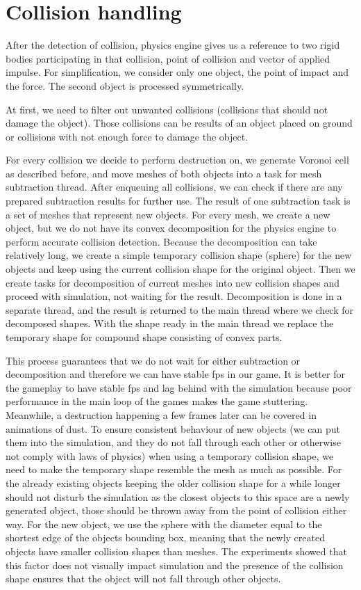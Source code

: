 \section{Collision handling}
\label{sec:collisions}
After the detection of collision, physics engine gives us a reference to two rigid bodies participating in that collision, point of collision and vector of applied impulse. For simplification, we consider only one object, the point of impact and the force. The second object is processed symmetrically.

At first, we need to filter out unwanted collisions (collisions that should not damage the object). Those collisions can be results of an object placed on ground or collisions with not enough force to damage the object. 

For every collision we decide to perform destruction on, we generate Voronoi cell as described before, and move meshes of both objects into a task for mesh subtraction thread. After enqueuing all collisions, we can check if there are any prepared subtraction results for further use. The result of one subtraction task is a set of meshes that represent new objects. For every mesh, we create a new object, but we do not have its convex decomposition for the physics engine to perform accurate collision detection. Because the decomposition can take relatively long, we create a simple temporary collision shape (\eg sphere) for the new objects and keep using the current collision shape for the original object. Then we create tasks for decomposition of current meshes into new collision shapes and proceed with simulation, not waiting for the result. Decomposition is done in a separate thread, and the result is returned to the main thread where we check for decomposed shapes. With the shape ready in the main thread we replace the temporary shape for compound shape consisting of convex parts.

This process guarantees that we do not wait for either subtraction or decomposition and therefore we can have stable fps in our game.  It is better for the gameplay to have stable fps and lag behind with the simulation because poor performance in the main loop of the games makes the game stuttering. Meanwhile, a destruction happening a few frames later can be covered in animations of dust. To ensure consistent behaviour of new objects (we can put them into the simulation, and they do not fall through each other or otherwise not comply with laws of physics) when using a temporary collision shape, we need to make the temporary shape resemble the mesh as much as possible.  For the already existing objects keeping the older collision shape for a while longer should not disturb the simulation as the closest objects to this space are a newly generated object, those should be thrown away from the point of collision either way. For the new object, we use the sphere with the diameter equal to the shortest edge of the objects bounding box, meaning that the newly created objects have smaller collision shapes than meshes. The experiments showed that this factor does not visually impact simulation and the presence of the collision shape ensures that the object will not fall through other objects. 


